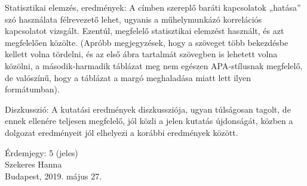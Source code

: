 \par Statisztikai elemzés, eredmények: A címben szereplő baráti kapcsolatok „hatása” szó használata
félrevezető lehet, ugyanis a műhelymunkázó korrelációs kapcsolatot vizsgált. Ezentúl,
megfelelő statisztikai elemzést használt, és azt megfelelően közölte. (Apróbb megjegyzések,
hogy a szöveget több bekezdésbe kellett volna tördelni, és az első ábra tartalmát szövegben
is lehetett volna közölni, a második-harmadik táblázat meg nem egészen APA-stílusnak
megfelelő, de valószínű, hogy a táblázat a margó meghaladása miatt lett ilyen
formátumban).
\\
\par Diszkusszió: A kutatási eredmények diszkussziója, ugyan túlságosan tagolt, de ennek ellenére
teljesen megfelelő, jól közli a jelen kutatás újdonságát, közben a dolgozat eredményeit jól
elhelyezi a korábbi eredmények között.

\vspace{3mm}

\begin{minipage}[t]{0.5\linewidth}
	\begin{flushleft}
		Érdemjegy: 5 (jeles) \\
		Szekeres Hanna \\
		Budapest, 2019. május 27.
	\end{flushleft}
\end{minipage}

